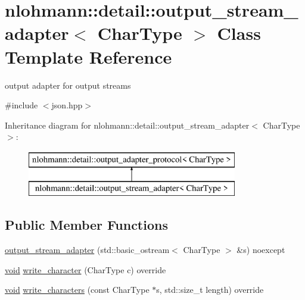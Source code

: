 \hypertarget{classnlohmann_1_1detail_1_1output__stream__adapter}{}\section{nlohmann\+::detail\+::output\+\_\+stream\+\_\+adapter$<$ Char\+Type $>$ Class Template Reference}
\label{classnlohmann_1_1detail_1_1output__stream__adapter}


output adapter for output streams  




{\ttfamily \#include $<$json.\+hpp$>$}

Inheritance diagram for nlohmann\+::detail\+::output\+\_\+stream\+\_\+adapter$<$ Char\+Type $>$\+:\begin{figure}[H]
\begin{center}
\leavevmode
\includegraphics[height=2.000000cm]{d8/d94/classnlohmann_1_1detail_1_1output__stream__adapter}
\end{center}
\end{figure}
\subsection*{Public Member Functions}
\begin{DoxyCompactItemize}
\item 
\mbox{\hyperlink{classnlohmann_1_1detail_1_1output__stream__adapter_ae44ed343cb1a716248547f48dd045b6a}{output\+\_\+stream\+\_\+adapter}} (std\+::basic\+\_\+ostream$<$ Char\+Type $>$ \&s) noexcept
\item 
\mbox{\hyperlink{namespacenlohmann_1_1detail_a59fca69799f6b9e366710cb9043aa77d}{void}} \mbox{\hyperlink{classnlohmann_1_1detail_1_1output__stream__adapter_a6e2698c76b200b2d8fac6cebfc43a245}{write\+\_\+character}} (Char\+Type c) override
\item 
\mbox{\hyperlink{namespacenlohmann_1_1detail_a59fca69799f6b9e366710cb9043aa77d}{void}} \mbox{\hyperlink{classnlohmann_1_1detail_1_1output__stream__adapter_ad61375497a7d03cb0bdcddfdaad185d0}{write\+\_\+characters}} (const Char\+Type $\ast$s, std\+::size\+\_\+t length) override
\end{DoxyCompactItemize}
